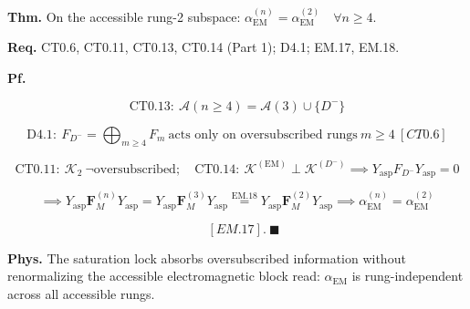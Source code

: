 \begin{theorem}\label{tag:EM-19}
\textbf{Thm.} On the accessible rung-2 subspace: $ \alpha_{\mathrm{EM}}^{(n)}=\alpha_{\mathrm{EM}}^{(2)}\quad\forall n\ge4.$

\textbf{Req.} CT0.6, CT0.11, CT0.13, CT0.14 (Part 1); D4.1; EM.17, EM.18.

\textbf{Pf.}

\[
\mathrm{CT0.13}:\ \mathcal A(n\ge4)=\mathcal A(3)\cup\{D^-\}
\]

\[
\mathrm{D4.1}:\ F_{D^-}=\bigoplus_{m\ge4}F_m\ \text{acts only on oversubscribed rungs}\ m\ge4\ [CT0.6]
\]

\[
\mathrm{CT0.11}:\ \mathcal K_2\ \neg\text{oversubscribed};\quad\mathrm{CT0.14}:\ \mathcal K^{(\mathrm{EM})}\perp\mathcal K^{(D^-)}\implies Y_{\mathrm{asp}}F_{D^-}Y_{\mathrm{asp}}=0
\]

\[
\implies Y_{\mathrm{asp}}\mathbf F_M^{(n)}Y_{\mathrm{asp}}=Y_{\mathrm{asp}}\mathbf F_M^{(3)}Y_{\mathrm{asp}}\overset{\mathrm{EM.18}}{=}Y_{\mathrm{asp}}\mathbf F_M^{(2)}Y_{\mathrm{asp}}\implies\alpha_{\mathrm{EM}}^{(n)}=\alpha_{\mathrm{EM}}^{(2)}
\]

\[
\quad [EM.17].\ \blacksquare
\]

\textbf{Phys.} The saturation lock absorbs oversubscribed information without renormalizing the accessible electromagnetic block read: $\alpha_{\mathrm{EM}}$ is rung-independent across all accessible rungs.

\end{theorem}

